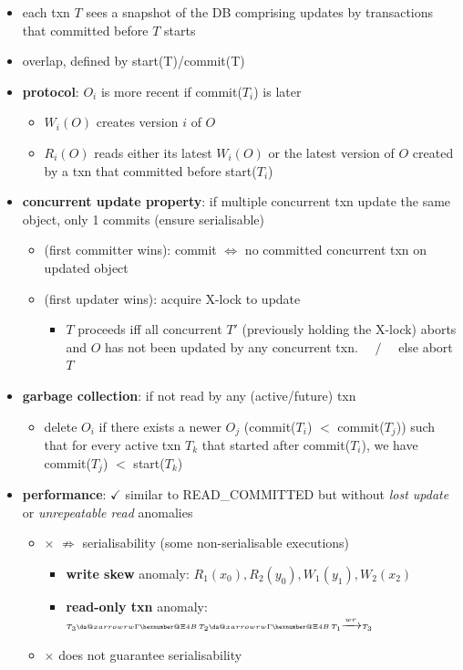 \documentclass[10pt, landscape]{article}
\makeatletter
\newcommand*{\xdashrightarrow}[2][]{%
  \mathrel{%
    \mathpalette{\da@xarrow{#1}{#2}{}\da@rightarrow{\,}{}}{}%
  }%
}
\newcommand*{\da@rightarrow}{\mathchar"0\hexnumber@\symAMSa 4B }
\newcommand*{\da@xarrow}[7]{%
  \sbox0{$\ifx#7\scriptstyle\scriptscriptstyle\else\scriptstyle\fi#5#1#6\m@th$}%
  \sbox2{$\ifx#7\scriptstyle\scriptscriptstyle\else\scriptstyle\fi#5#2#6\m@th$}%
  \sbox4{$#7\dabar@\m@th$}%
  \dimen@=\wd0 %
  \ifdim\wd2 >\dimen@
    \dimen@=\wd2 %
  \fi
  \count@=2 %
  \def\da@bars{\dabar@\dabar@}%
  \@whiledim\count@\wd4<\dimen@\do{%
    \advance\count@\@ne
    \expandafter\def\expandafter\da@bars\expandafter{%
      \da@bars
      \dabar@ 
    }%
  }%
  \mathrel{#3}%
  \mathrel{%
    \mathop{\da@bars}\limits
    \ifx\\#1\\%
  \else
    _{\copy0}%
  \fi
  \ifx\\#2\\%
\else
  ^{\copy2}%
\fi
}%
\mathrel{#4}%
}
\makeatother
\begin{document}
\begin{multicols*}{4}
  \begin{itemize}
    \item each txn $T$ sees a snapshot of the DB comprising updates by transactions that committed before $T$ starts
    \item {} overlap, defined by start(T)/commit(T)
    \item \textbf{protocol}: $O_i$ is more recent if commit($T_i$) is later
      \begin{itemize}
        \item $W_i(O)$ creates version $i$ of $O$ 
        \item $R_i(O)$ reads either its latest $W_i(O)$ or the latest version of $O$ created by a txn that committed before start($T_i$)
      \end{itemize}
    \item \textbf{concurrent update property}: if multiple concurrent txn update the same object, only 1 commits (ensure serialisable)
      \begin{itemize}
        \item {} (first committer wins): commit $\iff$ no committed concurrent txn on updated object
        \item {} (first updater wins): acquire X-lock to update
          \begin{itemize}
            \item $T$ proceeds iff all concurrent $T'$ (previously holding the X-lock) aborts and $O$ has not been updated by any concurrent txn. $\quad/\quad$ else abort $T$
          \end{itemize}
      \end{itemize}
    \item \textbf{garbage collection}: if not read by any (active/future) txn
      \begin{itemize}
        \item delete $O_i$ if there exists a newer $O_j$ (commit($T_i$) $<$ commit($T_j$)) such that for every active txn $T_k$ that started after commit($T_i$),  we have commit($T_j$) $<$ start($T_k$)
      \end{itemize}
    \item \textbf{performance}: $\checkmark$ similar to READ\_COMMITTED but without \textit{lost update} or \textit{unrepeatable read} anomalies
      \begin{itemize}
        \item $\times$ $\not\Rightarrow$ serialisability (some non-serialisable executions)
          \begin{itemize}
            \item \textbf{write skew} anomaly: $\scriptscriptstyle R_1(x_0), R_2(y_0), W_1(y_1), W_2(x_2)$
            \item \textbf{read-only txn} anomaly: $\scriptscriptstyle T_3 \xdashrightarrow{rw} T_2 \xdashrightarrow{rw} T_1 \xrightarrow{wr} T_3$
          \end{itemize}
        \item $\times$ does not guarantee serialisability
      \end{itemize}
  \end{itemize}


\end{multicols*}
\end{document}
